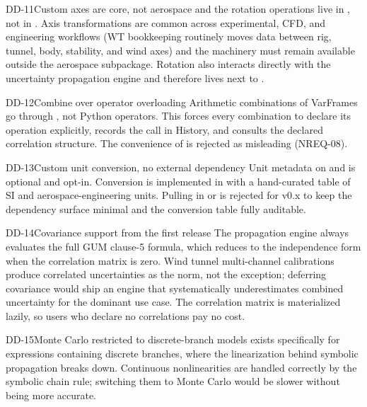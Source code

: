 \begin{ddbox}{DD-11}{Custom axes are core, not aerospace}
 and the rotation operations live in , not in
. Axis transformations are common across
experimental, CFD, and engineering workflows (WT bookkeeping routinely moves data between rig, tunnel, body, stability, and wind axes) and the
machinery must remain available outside the aerospace subpackage. Rotation
also interacts directly with the uncertainty propagation engine and
therefore lives next to .
\end{ddbox}

\begin{ddbox}{DD-12}{Combine over operator overloading}
Arithmetic combinations of VarFrames go through
, not Python operators. This forces every
combination to declare its operation explicitly, records the call in
History, and consults the declared correlation structure. The convenience
of  is rejected as misleading (NREQ-08).
\end{ddbox}

\begin{ddbox}{DD-13}{Custom unit conversion, no external dependency}
Unit metadata on  and  is optional and
opt-in. Conversion is implemented in  with a
hand-curated table of SI and aerospace-engineering units. Pulling in
 or  is rejected for v0.x to keep the
dependency surface minimal and the conversion table fully auditable.
\end{ddbox}

\begin{ddbox}{DD-14}{Covariance support from the first release}
The propagation engine always evaluates the full GUM clause-5 formula,
which reduces to the independence form when the correlation matrix is
zero. Wind tunnel multi-channel calibrations produce correlated
uncertainties as the norm, not the exception; deferring covariance would
ship an engine that systematically underestimates combined uncertainty for
the dominant use case. The correlation matrix is materialized lazily, so
users who declare no correlations pay no cost.
\end{ddbox}

\begin{ddbox}{DD-15}{Monte Carlo restricted to discrete-branch models}
 exists specifically for expressions containing
discrete branches, where the linearization behind symbolic propagation
breaks down. Continuous nonlinearities are handled correctly by the
symbolic chain rule; switching them to Monte Carlo would be slower without
being more accurate.
\end{ddbox}

